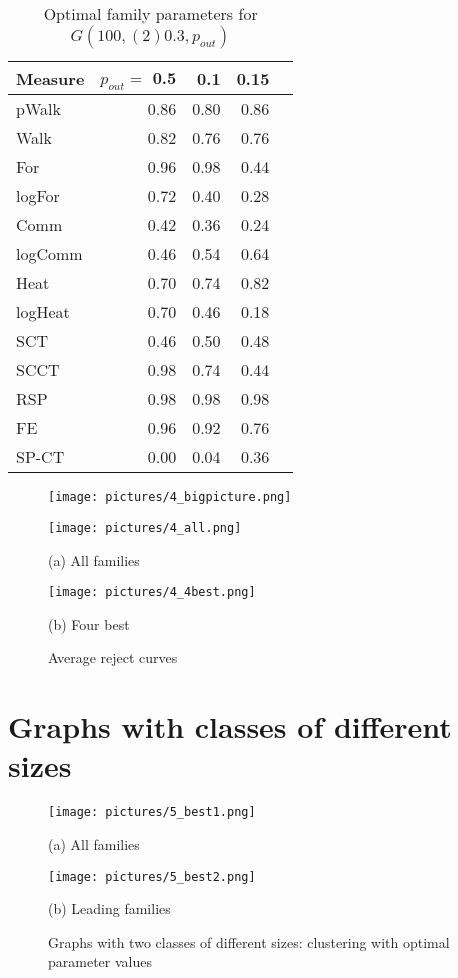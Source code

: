 \documentclass{article}
\begin{document}
\begin{table}[H]
	\begin{tabular}{lrrrr}
			\toprule
Measure & $p_{out}=$ 0.5 & 0.1 & 0.15\\
		\midrule
pWalk & 0.86 & 0.80 & 0.86\\
Walk & 0.82 & 0.76 & 0.76\\
For & 0.96 & 0.98 & 0.44\\
logFor & 0.72 & 0.40 & 0.28\\
Comm & 0.42 & 0.36 & 0.24\\
logComm & 0.46 & 0.54 & 0.64\\
Heat & 0.70 & 0.74 & 0.82\\
logHeat & 0.70 & 0.46 & 0.18\\
SCT & 0.46 & 0.50 & 0.48\\
SCCT & 0.98 & 0.74 & 0.44\\
RSP & 0.98 & 0.98 & 0.98\\
FE & 0.96 & 0.92 & 0.76\\
SP-CT & 0.00 & 0.04 & 0.36\\
		\bottomrule
	\end{tabular}\caption{\label{t_4_opt} Optimal family parameters for $G(100, (2)0.3, p_{out})$}
\end{table}

\begin{figure}[H]
	\texttt{[image: pictures/4\_bigpicture.png]}
\end{figure}

\begin{figure}[H]
	\begin{minipage}{.49\textwidth}
		\texttt{[image: pictures/4\_all.png]}\\
		\centerline{(a) All families}
	\end{minipage}
	\begin{minipage}{.49\textwidth}
		\texttt{[image: pictures/4\_4best.png]}\\
		\centerline{(b) Four best}
	\end{minipage}
\caption{\label{f_Rcur}Average reject curves}
\end{figure}

\newpage
\section{Graphs with classes of different sizes}
\begin{figure}[H]
	\begin{minipage}{.49\textwidth}
		\texttt{[image: pictures/5\_best1.png]}\\
		\centerline{(a) All families}
	\end{minipage}%
	\begin{minipage}{.49\textwidth}
		\texttt{[image: pictures/5\_best2.png]}\\
		\centerline{(b) Leading families}
	\end{minipage}
\caption{\label{f_difClas}Graphs with two classes of different sizes: clustering with optimal parameter values}
\end{figure}
\end{document}
